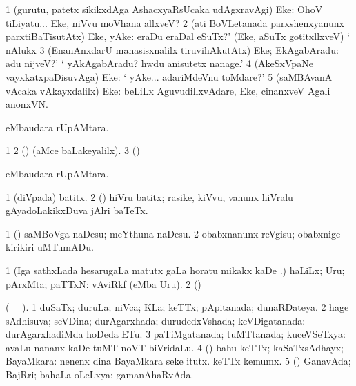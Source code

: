 {{{{{{\bentry
{} 
\gl{\BAavayx}
\bmng
\bnum
\num{1} (gurutu, patetx sikikxdAga AshacxyaRsUcaka udAgxravAgi) Eke:  OhoV tiLiyatu... Eke, niVvu moVhana allxveV? 
\num{2} (ati BoVLetanada parxshenxyanunx parxtiBaTisutAtx) Eke, yAke:  eraDu eraDal eSuTx?' (Eke, aSuTx gotitxllxveV) ` nAlukx 
\num{3} (EnanAnxdarU manasisxnalilx tiruvihAkutAtx) Eke; EkAgabAradu:  adu nijveV?' ` yAkAgabAradu? hwdu anisutetx nanage.' 
\num{4} (AkeSxVpaNe vayxkatxpaDisuvAga) Eke:  ` yAke... adariMdeVnu toMdare?' 
\num{5} (saMBAvanA vAcaka vAkayxdalilx) Eke:  beLiLx AguvudillxvAdare, Eke, cinanxveV Agali anonxVN. 
\enum
\emng
\eentry

\bentry
{}
  \gl{\nA}\bmng
{} eMbaudara rUpAMtara. 
\emng
\eentry

\bentry
{}
 \gl{\saMkiSx}\bmng
\bnum
\num{1}  
\num{2} (\ame)  (aMce baLakeyalilx). 
\num{3} (\birx)  
\enum
\emng
\eentry

\bentry
{}
 \gl{\sapUpa}\bmng
{} eMbaudara rUpAMtara. 
\emng
\eentry

\bentry
{} 
\gl{\nA}
\expl{}
\bmng
\bnum
\num{1} (diVpada) batitx. 
\num{2} (\shaveY) hiVru batitx; rasike, kiVvu, \mo vanunx hiVralu gAyadoLakikxDuva jAlri baTeTx. 
\enum
\emng

\noindent 
\gl{\pagu}
\bmng
\bnum
\num{1}  (\ashi) saMBoVga naDesu; meYthuna naDesu. 
\num{2}  obabxnanunx reVgisu; obabxnige kirikiri uMTumADu. 
\enum
\emng
\eentry

\bentry
{} 
\gl{\nA}
\bmng
\bnum
\num{1} (Iga sathxLada hesarugaLa matutx \saMpa gaLa horatu mikakx kaDe \pArxM.) haLiLx; Uru; pArxMta; paTTxN:  vAviRkf (eMba Uru). 
\num{2} (\pArxM)  
\enum
\emng
\eentry

\bentry
{}
  \gl{\gu} (\tara\  \tama\ ). \bmng
\bnum
\num{1} duSaTx; duruLa; niVca; KLa; keTTx; pApitanada; dunaRDateya. 
\num{2} hage sAdhisuva; seVDina; durAgarxhada; durudedxVshada; keVDigatanada:  durAgarxhadiMda hoDeda ETu. 
\num{3} paTiMgatanada; tuMTtanada; kuceVSeTxya:  avaLu nananx kaDe tuMT noVT biVridaLu. 
\num{4} (\AmA) bahu keTTx; kaSaTxsAdhayx; BayaMkara:  nenenx dina BayaMkara seke itutx.  keTTx kemumx. 
\num{5} (\ashi) GanavAda; BajRri; bahaLa oLeLxya; gamanAhaRvAda. 
\enum
\emng

}}}}}}
